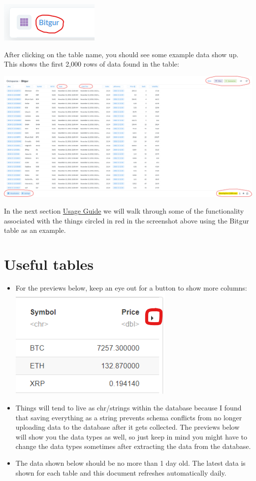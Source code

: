 \documentclass[
]{book}
\begin{document}
\includegraphics{images/BitgurTableSelect.png}

After clicking on the table name, you should see some example data show up. This shows the first 2,000 rows of data found in the table:

\includegraphics{images/BitgurPreview.png}

In the next section \protect\hyperlink{usage-guide}{Usage Guide} we will walk through some of the functionality associated with the things circled in red in the screenshot above using the Bitgur table as an example.

\hypertarget{useful-tables-1}{%
\section{Useful tables}\label{useful-tables-1}}

\begin{itemize}
\item
  For the previews below, keep an eye out for a button to show more columns:
  \includegraphics{images/MoreColumns.png}
\item
  Things will tend to live as chr/strings within the database because I found that saving everything as a string prevents schema conflicts from no longer uploading data to the database after it gets collected. The previews below will show you the data types as well, so just keep in mind you might have to change the data types sometimes after extracting the data from the database.
\item
  The data shown below should be no more than 1 day old. The latest data is shown for each table and this document refreshes automatically daily.
\end{itemize}
\end{document}
